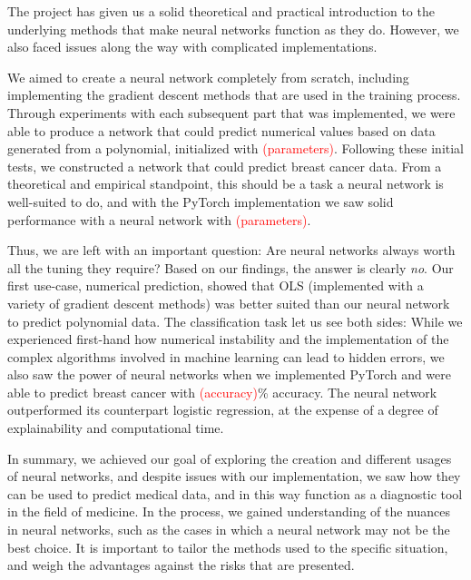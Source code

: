 The project has given us a solid theoretical and practical introduction to the underlying methods that make neural networks function as they do. However, we also faced issues along the way with complicated implementations.

We aimed to create a neural network completely from scratch, including implementing the gradient descent methods that are used in the training process. Through experiments with each subsequent part that was implemented, we were able to produce a network that could predict numerical values based on data generated from a polynomial, initialized with \textcolor{red}{(parameters)}. Following these initial tests, we constructed a network that could predict breast cancer data. From a theoretical and empirical standpoint, this should be a task a neural network is well-suited to do, and with the PyTorch implementation we saw solid performance with a neural network with \textcolor{red}{(parameters)}.

Thus, we are left with an important question: Are neural networks always worth all the tuning they require? Based on our findings, the answer is clearly \emph{no}. Our first use-case, numerical prediction, showed that OLS (implemented with a variety of gradient descent methods) was better suited than our neural network to predict polynomial data. The classification task let us see both sides: While we experienced first-hand how numerical instability and the implementation of the complex algorithms involved in machine learning can lead to hidden errors, we also saw the power of neural networks when we implemented PyTorch and were able to predict breast cancer with \textcolor{red}{(accuracy)}\% accuracy. The neural network outperformed its counterpart logistic regression, at the expense of a degree of explainability and computational time. 

In summary, we achieved our goal of exploring the creation and different usages of neural networks, and despite issues with our implementation, we saw how they can be used to predict medical data, and in this way function as a diagnostic tool in the field of medicine. In the process, we gained understanding of the nuances in neural networks, such as the cases in which a neural network may not be the best choice. It is important to tailor the methods used to the specific situation, and weigh the advantages against the risks that are presented.